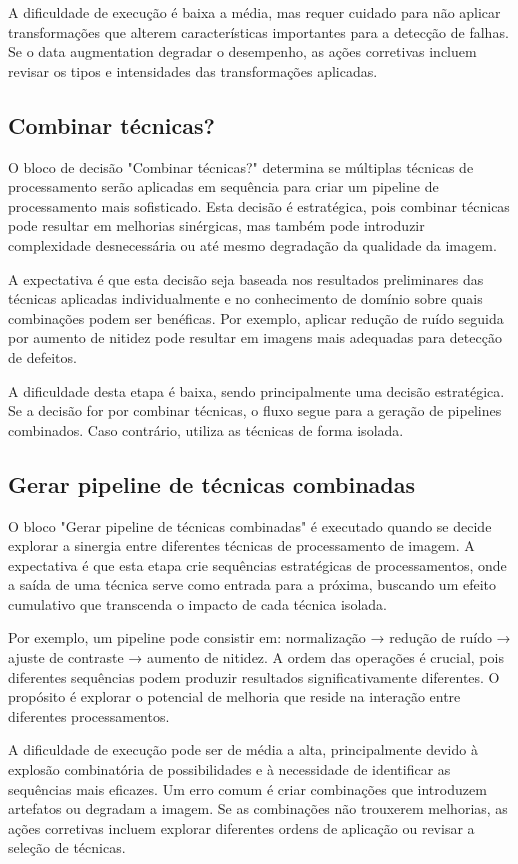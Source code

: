 A dificuldade de execução é baixa a média, mas requer cuidado para não aplicar transformações que alterem características importantes para a detecção de falhas. Se o data augmentation degradar o desempenho, as ações corretivas incluem revisar os tipos e intensidades das transformações aplicadas.

\subsection{Combinar técnicas?}
O bloco de decisão "Combinar técnicas?" determina se múltiplas técnicas de processamento serão aplicadas em sequência para criar um pipeline de processamento mais sofisticado. Esta decisão é estratégica, pois combinar técnicas pode resultar em melhorias sinérgicas, mas também pode introduzir complexidade desnecessária ou até mesmo degradação da qualidade da imagem.

A expectativa é que esta decisão seja baseada nos resultados preliminares das técnicas aplicadas individualmente e no conhecimento de domínio sobre quais combinações podem ser benéficas. Por exemplo, aplicar redução de ruído seguida por aumento de nitidez pode resultar em imagens mais adequadas para detecção de defeitos.

A dificuldade desta etapa é baixa, sendo principalmente uma decisão estratégica. Se a decisão for por combinar técnicas, o fluxo segue para a geração de pipelines combinados. Caso contrário, utiliza as técnicas de forma isolada.

\subsection{Gerar pipeline de técnicas combinadas}
O bloco "Gerar pipeline de técnicas combinadas" é executado quando se decide explorar a sinergia entre diferentes técnicas de processamento de imagem. A expectativa é que esta etapa crie sequências estratégicas de processamentos, onde a saída de uma técnica serve como entrada para a próxima, buscando um efeito cumulativo que transcenda o impacto de cada técnica isolada.

Por exemplo, um pipeline pode consistir em: normalização → redução de ruído → ajuste de contraste → aumento de nitidez. A ordem das operações é crucial, pois diferentes sequências podem produzir resultados significativamente diferentes. O propósito é explorar o potencial de melhoria que reside na interação entre diferentes processamentos.

A dificuldade de execução pode ser de média a alta, principalmente devido à explosão combinatória de possibilidades e à necessidade de identificar as sequências mais eficazes. Um erro comum é criar combinações que introduzem artefatos ou degradam a imagem. Se as combinações não trouxerem melhorias, as ações corretivas incluem explorar diferentes ordens de aplicação ou revisar a seleção de técnicas.

